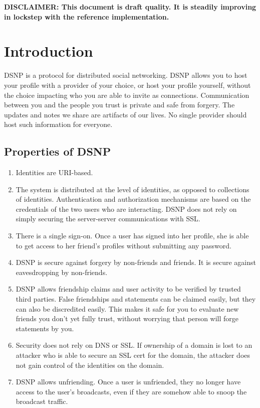 \documentclass[letterpaper,11pt,oneside]{article}
\begin{document}
{\noindent\bf\large DISCLAIMER: This document is draft quality. It is steadily
improving in lockstep with the reference implementation.}

\newpage

\tableofcontents


\section{Introduction}

DSNP is a protocol for distributed social networking. DSNP allows you to host
your profile with a provider of your choice, or host your profile yourself,
without the choice impacting who you are able to invite as connections.
Communication between you and the people you trust is private and safe from
forgery. The updates and notes we share are artifacts of our lives. No single
provider should host such information for everyone. 

\subsection{Properties of DSNP}

\begin{enumerate}

\item Identities are URI-based.

\item The system is distributed at the level of identities, as opposed to
collections of identities. Authentication and authorization mechanisms are
based on the credentials of the two users who are interacting. DSNP does not
rely on simply securing the server-server communications with SSL.

\item There is a single sign-on. Once a user has signed into her profile, she
is able to get access to her friend's profiles without submitting any password.

\item DSNP is secure against forgery by non-friends and friends. It is secure
against eavesdropping by non-friends.

\item DSNP allows friendship claims and user activity to be verified by trusted
third parties. False friendships and statements can be claimed easily, but they
can also be discredited easily. This makes it safe for you to evaluate new
friends you don't yet fully trust, without worrying that person will forge
statements by you.

\item Security does not rely on DNS or SSL. If ownership of a domain is lost to
an attacker who is able to secure an SSL cert for the domain, the attacker does
not gain control of the identities on the domain.

\item DSNP allows unfriending. Once a user is unfriended, they no longer have
access to the user's broadcasts, even if they are somehow able to snoop the
broadcast traffic.

\end{enumerate}
\end{document}
